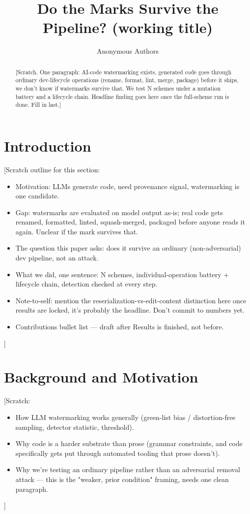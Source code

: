 \documentclass[acmsmall,screen,review,anonymous]{acmart}
\begin{document}
\title{Do the Marks Survive the Pipeline? (working title)}

\author{Anonymous Authors}

\begin{abstract}
[Scratch. One paragraph: AI-code watermarking exists, generated code goes through ordinary
dev-lifecycle operations (rename, format, lint, merge, package) before it ships, we don't know
if watermarks survive that. We test N schemes under a mutation battery and a lifecycle chain.
Headline finding goes here once the full-scheme run is done. Fill in last.]
\end{abstract}

\maketitle


\section{Introduction}

[Scratch outline for this section:
\begin{itemize}
    \item Motivation: LLMs generate code, need provenance signal, watermarking is one candidate.
    \item Gap: watermarks are evaluated on model output as-is; real code gets renamed, formatted,
      linted, squash-merged, packaged before anyone reads it again. Unclear if the mark survives that.
    \item The question this paper asks: does it survive an ordinary (non-adversarial) dev pipeline,
      not an attack.
    \item What we did, one sentence: N schemes, individual-operation battery + lifecycle chain,
      detection checked at every step.
    \item Note-to-self: mention the reserialization-vs-edit-content distinction here once results
      are locked, it's probably the headline. Don't commit to numbers yet.
    \item Contributions bullet list --- draft after Results is finished, not before.
\end{itemize}
]


\section{Background and Motivation}

[Scratch:
\begin{itemize}
    \item How LLM watermarking works generally (green-list bias / distortion-free sampling, detector
      statistic, threshold).
    \item Why code is a harder substrate than prose (grammar constraints, and code specifically gets
      put through automated tooling that prose doesn't).
    \item Why we're testing an ordinary pipeline rather than an adversarial removal attack --- this is
      the "weaker, prior condition" framing, needs one clean paragraph.
\end{itemize}
]
\end{document}
